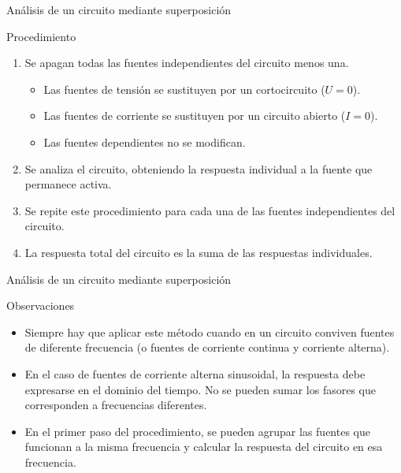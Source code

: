 \documentclass[xcolor={usenames,svgnames,dvipsnames}]{beamer}
\begin{document}
\begin{frame}[label={sec:org1097e84}]{Análisis de un circuito mediante superposición}
\begin{block}{Procedimiento}
\begin{enumerate}
\item Se apagan todas las fuentes \alert{independientes} del circuito menos una.
\begin{itemize}
\item Las fuentes de tensión se sustituyen por un cortocircuito (\(U = 0\)).
\item Las fuentes de corriente se sustituyen por un circuito abierto (\(I = 0\)).
\item Las fuentes \alert{dependientes} \alert{no} se modifican.
\end{itemize}
\item Se analiza el circuito, obteniendo la respuesta individual a la fuente que permanece activa.
\item Se repite este procedimiento para cada una de las fuentes \alert{independientes} del circuito.
\item La respuesta total del circuito es la suma de las respuestas individuales.
\end{enumerate}
\end{block}
\end{frame}

\begin{frame}[label={sec:org9a5268e}]{Análisis de un circuito mediante superposición}
\begin{block}{Observaciones}
\begin{itemize}
\item \alert{Siempre} hay que aplicar este método cuando en un circuito conviven fuentes de \alert{diferente frecuencia} (o fuentes de corriente continua y corriente alterna).
\item En el caso de fuentes de corriente alterna \alert{sinusoidal}, la respuesta debe expresarse en el \alert{dominio del tiempo}. \alert{No} se pueden \alert{sumar} los \alert{fasores} que corresponden a \alert{frecuencias diferentes}.
\item En el primer paso del procedimiento, se pueden agrupar las fuentes que funcionan a la misma frecuencia y calcular la respuesta del circuito en esa frecuencia.
\end{itemize}
\end{block}
\end{frame}
\end{document}
